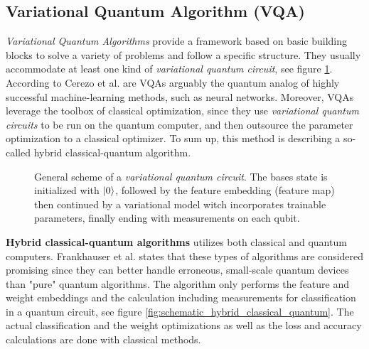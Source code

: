 \subsection{Variational Quantum Algorithm (VQA)}
\label{subsection:vqa_fundamentals}
\textit{Variational Quantum Algorithms} provide a framework based on basic building blocks to solve a variety of problems and follow a specific structure. They usually accommodate at least one kind of \textit{variational quantum circuit}, see figure \ref{fig:general_scheme_vqc}. According to Cerezo et al. are VQAs arguably the quantum analog of highly successful machine-learning methods, such as neural networks. Moreover, VQAs leverage the toolbox of classical optimization, since they use \textit{variational quantum circuits} to be run on the quantum computer, and then outsource the parameter optimization to a classical optimizer\cite{Cerezo_2021}. To sum up, this method is describing a so-called hybrid classical-quantum  algorithm.

\begin{figure}[!h]
    \centering
    \caption{General scheme of a \textit{variational quantum circuit}. The bases state is initialized with $\ket{0}$, followed by the feature 
    embedding (feature map) then continued by a variational model witch incorporates trainable parameters, finally ending with measurements on each qubit.} 
    \label{fig:general_scheme_vqc}
\end{figure}

\textbf{Hybrid classical-quantum algorithms} utilizes both classical and quantum computers. Frankhauser et al. states that these types of algorithms are considered promising since they can better handle erroneous, small-scale quantum devices than "pure" quantum algorithms\cite{fankhauser_multiple_2021}. The algorithm only performs the feature and weight embeddings and the calculation including measurements for classification in a quantum circuit, see figure \ref{fig:schematic_hybrid_classical_quantum}. The actual classification and the weight optimizations as well as the loss and accuracy calculations are done with classical methods. 

